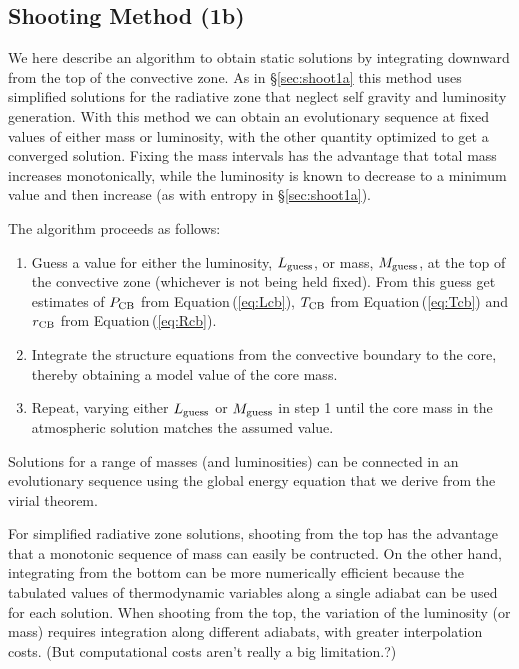 \documentclass[12pt, preprint,numberedappendix]{emulateapj}
\newcommand{\Eq}[1]{Equation\,(\ref{#1})}
\newcommand{\cb}{_{\rm CB}}
\begin{document}
\subsection{Shooting Method (1b)}\label{sec:shoot1b}
We here describe an algorithm to obtain static solutions by integrating downward from the top of the convective zone.    As in \S\ref{sec:shoot1a} this method uses simplified solutions for the  radiative zone that neglect self gravity and luminosity generation.  With this method we can obtain an evolutionary sequence at fixed values of either mass or luminosity, with the other quantity optimized to get a converged solution.   Fixing the mass intervals has the advantage that total mass increases monotonically, while the luminosity is known to decrease to a minimum value and then increase (as with entropy in \S\ref{sec:shoot1a}). 

 The algorithm proceeds as follows:
\begin{enumerate}
\item Guess a value for either the luminosity, $L_{\rm guess}$, or mass, $M_{\rm guess}$, at the top of the convective zone (whichever is not being held fixed).  From this guess get estimates of $P\cb$ from \Eq{eq:Lcb}, $T\cb$ from \Eq{eq:Tcb} and $r\cb$ from \Eq{eq:Rcb}.
\item Integrate the structure equations from the convective boundary to the core, thereby obtaining a model value of the core mass. 
\item Repeat,  varying either $L_{\rm guess}$ or  $M_{\rm guess}$ in step 1 until the core mass in the atmospheric solution matches the assumed value.
\end{enumerate}

Solutions for a range of masses (and luminosities) can be connected in an evolutionary sequence using the global energy equation that we derive from the virial theorem.

For simplified radiative zone solutions, shooting from the top has the advantage that a monotonic sequence of mass can easily be contructed.  On the other hand, integrating from the bottom can be more numerically efficient because the tabulated values of thermodynamic variables along a single adiabat can be used for each solution.  When shooting from the top, the variation of the luminosity (or mass) requires integration along different adiabats, with greater interpolation costs.  (But computational costs aren't really a big limitation.?)
\end{document}

